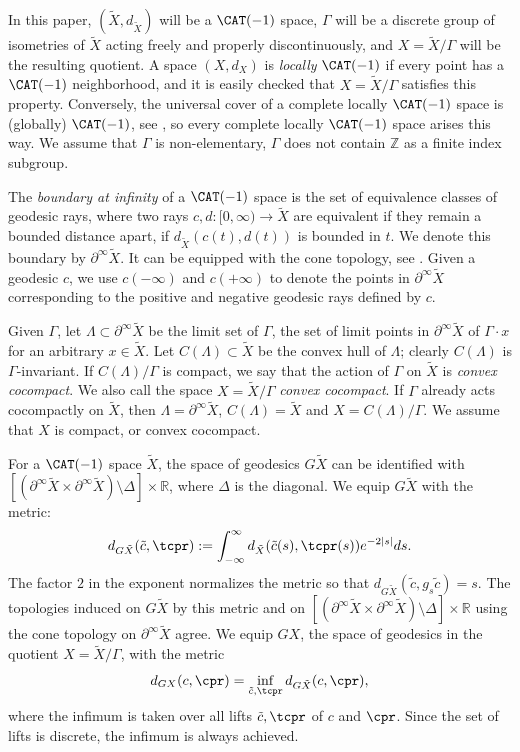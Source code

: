 In this paper, $(\tilde X, d_{\tilde X})$ will be a $\CAT(-1)$ space, $\Gamma$ will be a discrete group of isometries of $\tilde X$ acting freely and properly discontinuously, and $X=\tilde X/\Gamma$ will be the resulting quotient. A space $(X,d_X)$ is \emph{locally} $\CAT(-1)$ if every point has a $\CAT(-1)$ neighborhood, and it is easily checked that $X=\tilde X/\Gamma$ satisfies this property. Conversely, the universal cover of a complete locally $\CAT(-1)$ space is (globally) $\CAT(-1)$, see \eg \cite[Th.\,II.4.1]{bh}, so every complete locally $\CAT(-1)$ space arises this way. We assume that $\Gamma$ is non-elementary, \ie $\Gamma$ does not contain $\mathbb{Z}$ as a finite index subgroup.

The \emph{boundary at infinity} of a $\CAT(-1)$ space is the set of equivalence classes of geodesic rays, where two rays $c,d:[0,\infty) \to \tilde X$ are equivalent if they remain a bounded distance apart, \ie if $d_{\tilde X}(c(t), d(t))$ is bounded in $t$. We denote this boundary by $\partial^\infty \tilde X$. It can be equipped with the cone topology, see \eg \cite[Chap.\,II.8]{bh}. Given a geodesic $c$, we use $c(-\infty)$ and $c(+\infty)$ to denote the points in $\partial^\infty \tilde X$ corresponding to the positive and negative geodesic rays defined by $c$.

Given $\Gamma$, let $\Lambda \subset \partial^\infty \tilde X$ be the limit set of $\Gamma$, \ie the set of limit points in $\partial^\infty\tilde X$ of $\Gamma\cdot x$ for an arbitrary $x\in \tilde X$. Let $C(\Lambda) \subset \tilde X$ be the convex hull of $\Lambda$; clearly $C(\Lambda)$ is $\Gamma$\nobreakdash-invariant. If $C(\Lambda)/\Gamma$ is compact, we say that the action of $\Gamma$ on $\tilde X$ is \emph{convex cocompact}. We also call the space $X=\tilde X/\Gamma$ \emph{convex cocompact}. If $\Gamma$ already acts cocompactly on $\tilde X$, then $\Lambda=\partial^\infty \tilde X$, $C(\Lambda) = \tilde X$ and $X= C(\Lambda)/\Gamma$. We assume that $X$ is compact, or convex cocompact.

For a $\CAT(-1)$ space $\tilde X$, the space of geodesics $G\tilde X$ can be identified with \hbox{$[(\partial^\infty\tilde X \times \partial^\infty\tilde X)\setminus \Delta] \times \mathbb{R}$}, where $\Delta$ is the diagonal. We equip $G\tilde X$ with the metric:
\[ d_{G\tilde X}(\tilde c,\tcpr) := \int_{-\infty}^\infty d_{\tilde X}(\tilde c(s),\tcpr(s)) e^{-2|s|}ds.\]
The factor $2$ in the exponent normalizes the metric so that $d_{G\tilde X}(\tilde c, g_s \tilde c)=s$. The topologies induced on $G\tilde X$ by this metric and on $[(\partial^\infty\tilde X \times \partial^\infty\tilde X)\setminus \Delta] \times \mathbb{R}$ using the cone topology on $\partial^\infty \tilde X$ agree.
We equip $GX$, the space of geodesics in the quotient $X=\tilde X/\Gamma$, with the metric
\[ d_{GX}(c,\cpr) = \inf_{\tilde c,\tcpr} d_{G\tilde X}(c,\cpr),\]
where the infimum is taken over all lifts $\tilde c, \tcpr$ of $c$ and $\cpr$. Since the set of lifts is discrete, the infimum is always achieved.

